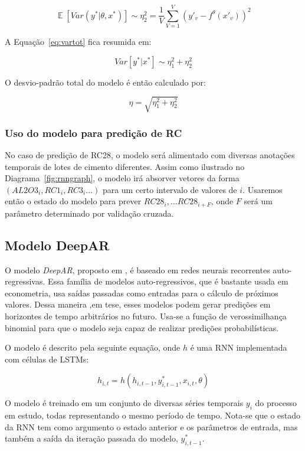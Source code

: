 \[
  \mathop{\mathbb{E}}[Var(y^* | \theta,x^*)] \sim \eta_2^2 = \frac{1}{V}\sum^V_{V=1}(y'_v - f^\theta(x'_v))^2
\]



A Equação~\ref{eq:vartot} fica resumida em:


\[ Var[y^* | x^*] \sim \eta^2_1 + \eta^2_2 \] 

O desvio-padrão total do modelo é então calculado por:

\[
  \eta = \sqrt{\eta^2_1 + \eta^2_2}  
\]

\subsubsection{Uso do modelo para predição de RC}

No caso de predição de RC28, o modelo será alimentado com diversas anotações
temporais de lotes de cimento diferentes. Assim como ilustrado no
Diagrama~\ref{fig:rnngraph}, o modelo irá absorver vetores da forma
$(AL2O3_i,RC1_i,RC3_i \dots)$ para um certo intervalo de valores de $i$.
Usaremos então o estado do modelo para prever $RC28_i, \dots RC28_{i+F}$, onde
$F$ será um parâmetro determinado por validação cruzada.

\subsection{Modelo DeepAR}

O modelo \textit{DeepAR}, proposto em \citep{deepar}, é baseado em redes neurais
recorrentes auto-regressivas. Essa família de modelos auto-regressivos, que é bastante usada em
econometria, usa saídas passadas como entradas para o cálculo de próximos
valores. Dessa maneira ,em tese, esses modelos podem gerar predições em horizontes
de tempo arbitrários no futuro.
Usa-se a função de verossimilhança binomial para que o modelo seja capaz
de realizar predições probabilísticas.

O modelo é descrito pela seguinte equação, onde $h$ é uma RNN implementada com células de LSTMs:

\[
h_{i,t} = h(h_{i,t-1},y^*_{i,t-1},x_{i,t}, \theta)
\]

O modelo é treinado em um conjunto de diversas séries temporais $y_i$ do
processo em estudo, todas representando o mesmo período de tempo. Nota-se que o estado da RNN tem como argumento o estado anterior e os parâmetros de entrada, mas também a saída da iteração passada do modelo, $y^*_{i,t-1}$. \\

